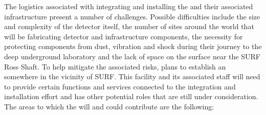 The logistics associated with integrating and installing the
  and their associated infrastructure present
a number of challenges. Possible difficulties include the size and
complexity of the detector itself, the number of sites around the
world that will be fabricating detector and infrastructure components,
the necessity for protecting components from dust, vibration and shock
during their journey to the deep underground laboratory and the lack
of space on the surface near the SURF Ross Shaft. To help
mitigate the associated risks,  plans to establish an
 somewhere in the vicinity of SURF. This facility
and its associated staff will need to provide certain functions and
services connected to the   integration and
installation effort and has other potential roles that are still under
consideration.  The areas to which the  will and could
contribute are the following:
